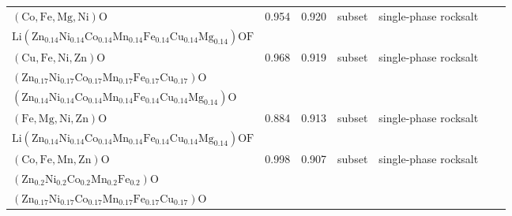 \begin{table}
{\begin{tabular}{lcccccr}
$(\mathrm{Co},\mathrm{Fe},\mathrm{Mg},\mathrm{Ni})\mathrm{O}$ & 0.954 & 0.920 & subset & single-phase rocksalt &  \makecell{$(\mathrm{Zn}_{0.14}\mathrm{Ni}_{0.14}\mathrm{Co}_{0.14}\mathrm{Mn}_{0.14}\mathrm{Fe}_{0.14}\mathrm{Cu}_{0.14}\mathrm{Mg}_{0.14})\mathrm{O}$\\
$\mathrm{Li}(\mathrm{Zn}_{0.14}\mathrm{Ni}_{0.14}\mathrm{Co}_{0.14}\mathrm{Mn}_{0.14}\mathrm{Fe}_{0.14}\mathrm{Cu}_{0.14}\mathrm{Mg}_{0.14})\mathrm{OF}$} & ~\cite{Sivak_HighEntropy_PhysicalReviewLetters_2025,Lin_MechanochemicalSynthesis_JournalofMaterialsScience_2020,pu2023mg} \\
$(\mathrm{Cu},\mathrm{Fe},\mathrm{Ni},\mathrm{Zn})\mathrm{O}$ & 0.968 & 0.919 & subset & single-phase rocksalt & \makecell{$\mathrm{Fe}_{0.2}\mathrm{Co}_{0.2}\mathrm{Ni}_{0.2}\mathrm{Cu}_{0.2}\mathrm{Zn}_{0.2}\mathrm{O}$\\
$(\mathrm{Zn}_{0.17}\mathrm{Ni}_{0.17}\mathrm{Co}_{0.17}\mathrm{Mn}_{0.17}\mathrm{Fe}_{0.17}\mathrm{Cu}_{0.17})\mathrm{O}$\\
$(\mathrm{Zn}_{0.14}\mathrm{Ni}_{0.14}\mathrm{Co}_{0.14}\mathrm{Mn}_{0.14}\mathrm{Fe}_{0.14}\mathrm{Cu}_{0.14}\mathrm{Mg}_{0.14})\mathrm{O}$} & ~\cite{He_LithiumStorage_NanoResearch_2025,Gautam_SubstitutedCatalysts_CatalSciTechnol_2026} \\
$(\mathrm{Fe},\mathrm{Mg},\mathrm{Ni},\mathrm{Zn})\mathrm{O}$ & 0.884 & 0.913 & subset & single-phase rocksalt & \makecell{$(\mathrm{Zn}_{0.14}\mathrm{Ni}_{0.14}\mathrm{Co}_{0.14}\mathrm{Mn}_{0.14}\mathrm{Fe}_{0.14}\mathrm{Cu}_{0.14}\mathrm{Mg}_{0.14})\mathrm{O}$\\
$\mathrm{Li}(\mathrm{Zn}_{0.14}\mathrm{Ni}_{0.14}\mathrm{Co}_{0.14}\mathrm{Mn}_{0.14}\mathrm{Fe}_{0.14}\mathrm{Cu}_{0.14}\mathrm{Mg}_{0.14})\mathrm{OF}$} & ~\cite{Lin_MechanochemicalSynthesis_JournalofMaterialsScience_2020} \\
$(\mathrm{Co},\mathrm{Fe},\mathrm{Mn},\mathrm{Zn})\mathrm{O}$ & 0.998 & 0.907 & subset &  single-phase rocksalt & \makecell{$(\mathrm{Co}_{0.2}\mathrm{Fe}_{0.2}\mathrm{Mn}_{0.2}\mathrm{Ni}_{0.2}\mathrm{Zn}_{0.2})\mathrm{O}$\\
$(\mathrm{Zn}_{0.2}\mathrm{Ni}_{0.2}\mathrm{Co}_{0.2}\mathrm{Mn}_{0.2}\mathrm{Fe}_{0.2})\mathrm{O}$\\
$(\mathrm{Zn}_{0.17}\mathrm{Ni}_{0.17}\mathrm{Co}_{0.17}\mathrm{Mn}_{0.17}\mathrm{Fe}_{0.17}\mathrm{Cu}_{0.17})\mathrm{O}$} & ~\cite{Kirakosyan_RockSaltSpinel_ChemicalEngineeringJournal_2025,Dey_RocksaltNanocrystals_JournaloftheAmericanChemicalSociety_2025} \\

\end{tabular}}
\end{table}
